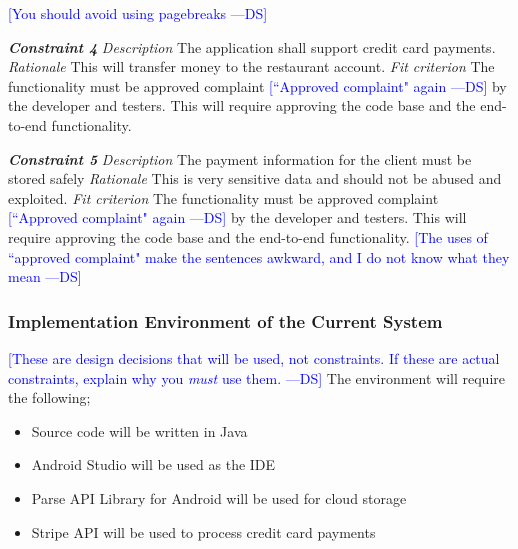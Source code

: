 \documentclass[12pt, titlepage]{article}
\newcommand{\authornote}[3]{\textcolor{#1}{[#3 ---#2]}}
\newcommand{\authornote}[3]{}
\newcommand{\ds}[1]{\authornote{blue}{DS}{#1}}
\begin{document}
\ds{You should avoid using pagebreaks}

\pagebreak 
\noindent\textbf{\textit{Constraint 4}}
\newline
\textit{Description}\newline
The application shall support credit card payments. \newline\newline
\textit{Rationale}\newline
This will transfer money to the restaurant account. \newline\newline
\textit{Fit criterion}\newline
The functionality must be approved complaint \ds{``Approved complaint" again} by the developer and testers. This will require approving the code base and the end-to-end functionality.\newline\newline

\noindent\textbf{\textit{Constraint 5}}
\newline
\textit{Description}\newline
The payment information for the client must be stored safely \newline\newline
\textit{Rationale}\newline
This is very sensitive data and should not be abused and exploited. \newline\newline
\textit{Fit criterion}\newline
The functionality must be approved complaint \ds{``Approved complaint" again} by the developer and testers. This will require approving the code base and the end-to-end functionality.
\ds{The uses of ``approved complaint" make the sentences awkward, and I do not know what they mean}\newline\newline

\subsubsection{Implementation Environment of the Current System}
\ds{These are design decisions that will be used, not constraints. If these are
actual constraints, explain why you \emph{must} use them.}
The environment will require the following;
\begin{itemize}
  \item Source code will be written in Java
  \item Android Studio will be used as the IDE
  \item 	Parse API Library for Android will be used for cloud storage
  \item 	Stripe API will be used to process credit card payments
\end{itemize}
\end{document}
